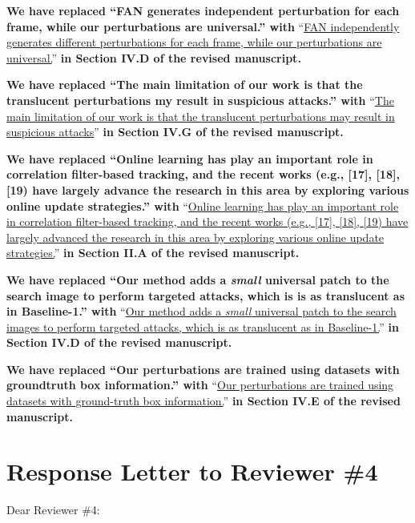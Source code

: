 \documentclass[12pt]{article}
\begin{document}
\textbf{We have replaced ``FAN generates independent perturbation for each frame, while our perturbations are universal.'' with} ``\uline{FAN independently generates different perturbations for each frame, while our perturbations are universal.}'' \textbf{in Section IV.D of the revised manuscript.}

\textbf{We have replaced ``The main limitation of our work is that the translucent perturbations my result in suspicious attacks.'' with} ``\uline{The main limitation of our work is that the translucent perturbations may result in suspicious attacks}'' \textbf{in Section IV.G of the revised manuscript.}

\textbf{We have replaced ``Online learning has play an important role in correlation filter-based tracking, and the recent works (e.g., [17], [18], [19) have largely advance the research in this area by exploring various online update strategies.'' with} ``\uline{Online learning has play an important role in correlation filter-based tracking, and the recent works (e.g., [17], [18], [19) have largely advanced the research in this area by exploring various online update strategies.}'' \textbf{in Section II.A of the revised manuscript.}

\textbf{We have replaced ``Our method adds a \textit{small} universal patch to the search image to perform targeted attacks, which is is as translucent as in Baseline-1.'' with} ``\uline{Our method adds a \textit{small} universal patch to the search images to perform targeted attacks, which is as translucent as in Baseline-1.}'' \textbf{in Section IV.D of the revised manuscript.}

\textbf{We have replaced ``Our perturbations are trained using datasets with groundtruth box information.'' with} ``\uline{Our perturbations are trained using datasets with ground-truth box information.}'' \textbf{in Section IV.E of the revised manuscript.}

\clearpage
\newpage
{\centering\section*{Response Letter to Reviewer \#4}}
\noindent Dear Reviewer \#4:
\end{document}
